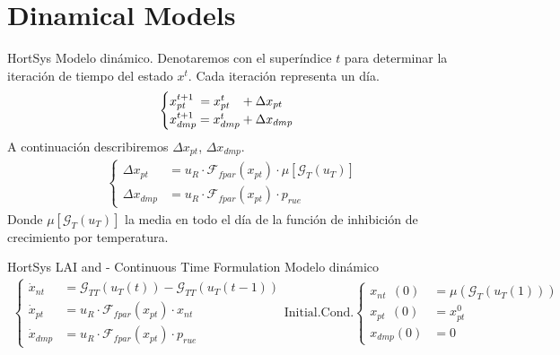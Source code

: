 

    \section{Dinamical Models}

    \begin{model}{HortSys}{}\label{model:HortSys}
        Modelo dinámico. Denotaremos con el superíndice $t$ para determinar la iteración de tiempo del estado $x^t$. Cada iteración representa un día.
        \begin{gather}
            \begin{cases}
                x_{pt}^{t+1}  \hspace{0.25em}   = x_{pt}^{t}    \hspace{0.8em}  + \Delta x_{pt}    \\
                x_{dmp}^{t+1}    = x_{dmp}^{t}   + \Delta x_{dmp}    \\
            \end{cases}
        \end{gather}      
        A continuación describiremos $\Delta x_{pt}$, $\Delta x_{dmp}$.
        \begin{gather}
            \begin{cases}
                \Delta x_{pt}  &  = u_R \cdot \mathcal{F}_{fpar}(x_{pt}) \cdot \mu[\mathcal{G}_{T}(u_T)] \\
                \Delta x_{dmp} &  =  u_R  \cdot \mathcal{F}_{fpar}(x_{pt}) \cdot p_{rue}
            \end{cases}
        \end{gather}      
        Donde $\mu[\mathcal{G}_{T}(u_T)]$ la media en todo el día de la función de inhibición de crecimiento por temperatura.
    \end{model}

    
    \begin{model}{HortSys LAI and - Continuous Time Formulation}
     Modelo dinámico
    \begin{gather}
        \begin{cases}
            \dot{x}_{nt}  &= \mathcal{G}_{TT}(u_T(t)) - \mathcal{G}_{TT}(u_T(t-1))  \\
            \dot{x}_{pt}  &  = u_R \cdot \mathcal{F}_{fpar}(x_{pt}) \cdot x_{nt} \\
            \dot{x}_{dmp} &  =  u_R  \cdot \mathcal{F}_{fpar}(x_{pt}) \cdot p_{rue}
        \end{cases}
        \text{Initial.Cond.}
        \begin{cases}
            x_{nt} \ \ (0)  & = \mu(\mathcal{G}_T(u_T(1)))  \\
            x_{pt} \ \ (0)  &  = x_{pt}^0 \\
            x_{dmp}(0) &  =  0
        \end{cases}
    \end{gather}        
    \end{model}

